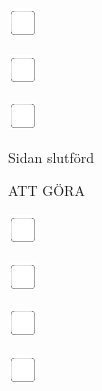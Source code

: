 \documentclass[11pt,titlepage]{article}
\begin{document}
\vspace{10mm}

\noindent
\includegraphics[]{checkbox-4mm.pdf}

\vspace{10mm}

\noindent
\includegraphics[]{checkbox-4mm.pdf}

\vspace{10mm}

\noindent
\includegraphics[]{checkbox-4mm.pdf}

\vspace{4mm}

\hfill Sidan slutförd \hspace{20mm}

\pagebreak

\small
\hfill ATT GÖRA

\vspace{6mm}

\noindent
\includegraphics[]{checkbox-4mm.pdf}

\vspace{10mm}

\noindent
\includegraphics[]{checkbox-4mm.pdf}

\vspace{10mm}

\noindent
\includegraphics[]{checkbox-4mm.pdf}

\vspace{10mm}

\noindent
\includegraphics[]{checkbox-4mm.pdf}
\end{document}
